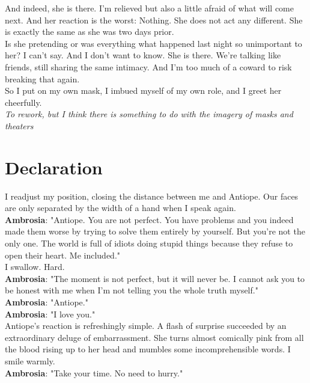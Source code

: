\documentclass{report}
\newcommand{\dcomment}[1]{
	\emph{#1}
	\\
}
\newcommand{\speaker}[1]{
	\textbf{#1}: 
}
\newcommand{\gsection}[1]{
	\section*{#1}
	\label{#1}
}
\begin{document}
And indeed, she is there. I'm relieved but also a little afraid of what will come next. And her reaction is the worst: Nothing. She does not act any different. She is exactly the same as she was two days prior.\\

Is she pretending or was everything what happened last night so unimportant to her? I can't say. And I don't want to know. She is there. We're talking like friends, still sharing the same intimacy. And I'm too much of a coward to risk breaking that again.\\

So I put on my own mask, I imbued myself of my own role, and I greet her cheerfully.\\

\dcomment{
	To rework, but I think there is something to do with the imagery of masks and theaters
}

\gsection{Declaration}

I readjust my position, closing the distance between me and Antiope. Our faces are only separated by the width of a hand when I speak again.\\

\speaker{Ambrosia} "Antiope. You are not perfect. You have problems and you indeed made them worse by trying to solve them entirely by yourself. But you're not the only one. The world is full of idiots doing stupid things because they refuse to open their heart. Me included."\\

I swallow. Hard.\\

\speaker{Ambrosia} "The moment is not perfect, but it will never be. I cannot ask you to be honest with me when I'm not telling you the whole truth myself."\\

\speaker{Ambrosia} "Antiope."\\

\speaker{Ambrosia} "I love you."\\

Antiope's reaction is refreshingly simple. A flash of surprise succeeded by an extraordinary deluge of embarrassment. She turns almost comically pink from all the blood rising up to her head and mumbles some incomprehensible words. I smile warmly.\\

\speaker{Ambrosia} "Take your time. No need to hurry."\\
\end{document}
